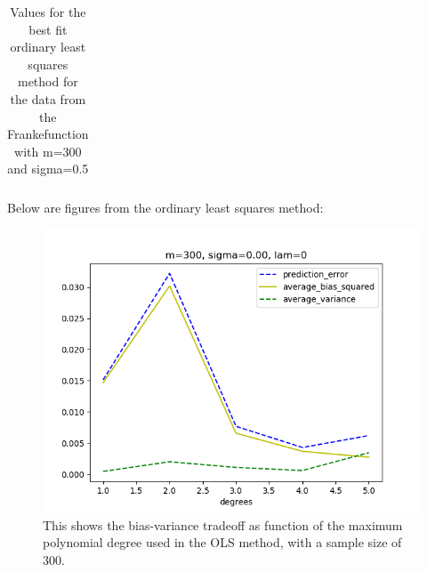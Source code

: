 \begin{table}
\begin{tabular}{lrrrrr}
	\end{tabular}
	\caption{Values for the best fit ordinary least squares method for the data from the Frankefunction with m=300 and sigma=0.5}
	\label{Table:1}
\end{table}
\FloatBarrier


Below are figures from the ordinary least squares method:
\FloatBarrier
\begin{figure}[!ht]
	\centering
	\FloatBarrier
    \includegraphics[width=1\textwidth]{plot_ols_without_r2/olsprediction_error_vs_degrees_m300_l300_s0.png}
	
	\caption{This shows the bias-variance tradeoff as function of the maximum polynomial degree used in the OLS method, with a sample size of 300.}
	\label{fig:1}
\end{figure}
\FloatBarrier

\medskip

